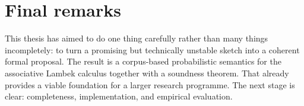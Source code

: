 \section{Final remarks}
This thesis has aimed to do one thing carefully rather than many things incompletely: to turn a
promising but technically unstable sketch into a coherent formal proposal. The result is a
corpus-based probabilistic semantics for the associative Lambek calculus together with a
soundness theorem. That already provides a viable foundation for a larger research programme.
The next stage is clear: completeness, implementation, and empirical evaluation.
